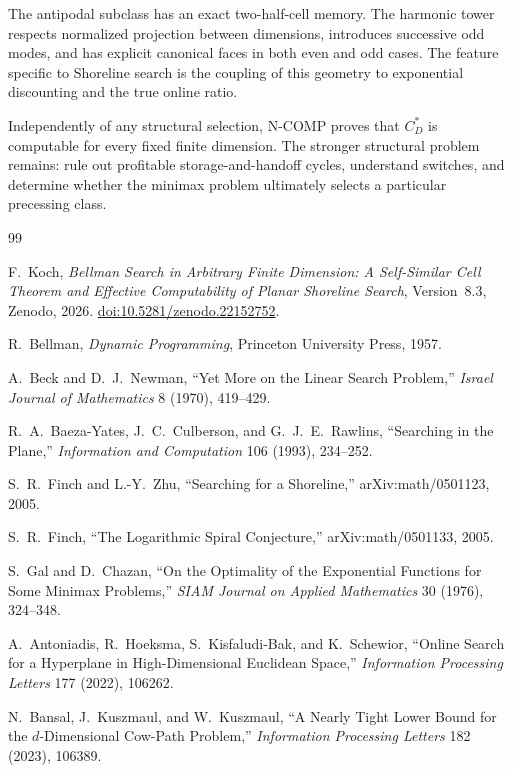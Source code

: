 \documentclass[10pt,a4paper]{article}
\newcommand{\cstar}{C^{*}}
\theoremstyle{plain}
\theoremstyle{definition}
\theoremstyle{remark}
\begin{document}
The antipodal subclass has an exact two-half-cell memory. The harmonic tower respects normalized projection between dimensions, introduces successive odd modes, and has explicit canonical faces in both even and odd cases. The feature specific to Shoreline search is the coupling of this geometry to exponential discounting and the true online ratio.

Independently of any structural selection, N-COMP proves that $\cstar_D$ is computable for every fixed finite dimension. The stronger structural problem remains: rule out profitable storage-and-handoff cycles, understand switches, and determine whether the minimax problem ultimately selects a particular precessing class.

\begin{thebibliography}{99}

F.~Koch,
\emph{Bellman Search in Arbitrary Finite Dimension: A Self-Similar Cell Theorem and Effective Computability of Planar Shoreline Search},
Version~8.3, Zenodo, 2026.
\href{https://doi.org/10.5281/zenodo.22152752}{doi:10.5281/zenodo.22152752}.

R.~Bellman,
\emph{Dynamic Programming},
Princeton University Press, 1957.

A.~Beck and D.~J.~Newman,
``Yet More on the Linear Search Problem,''
\emph{Israel Journal of Mathematics} 8 (1970), 419--429.

R.~A.~Baeza-Yates, J.~C.~Culberson, and G.~J.~E.~Rawlins,
``Searching in the Plane,''
\emph{Information and Computation} 106 (1993), 234--252.

S.~R.~Finch and L.-Y.~Zhu,
``Searching for a Shoreline,''
arXiv:math/0501123, 2005.

S.~R.~Finch,
``The Logarithmic Spiral Conjecture,''
arXiv:math/0501133, 2005.

S.~Gal and D.~Chazan,
``On the Optimality of the Exponential Functions for Some Minimax Problems,''
\emph{SIAM Journal on Applied Mathematics} 30 (1976), 324--348.

A.~Antoniadis, R.~Hoeksma, S.~Kisfaludi-Bak, and K.~Schewior,
``Online Search for a Hyperplane in High-Dimensional Euclidean Space,''
\emph{Information Processing Letters} 177 (2022), 106262.

N.~Bansal, J.~Kuszmaul, and W.~Kuszmaul,
``A Nearly Tight Lower Bound for the $d$-Dimensional Cow-Path Problem,''
\emph{Information Processing Letters} 182 (2023), 106389.


\end{thebibliography}
\end{document}
